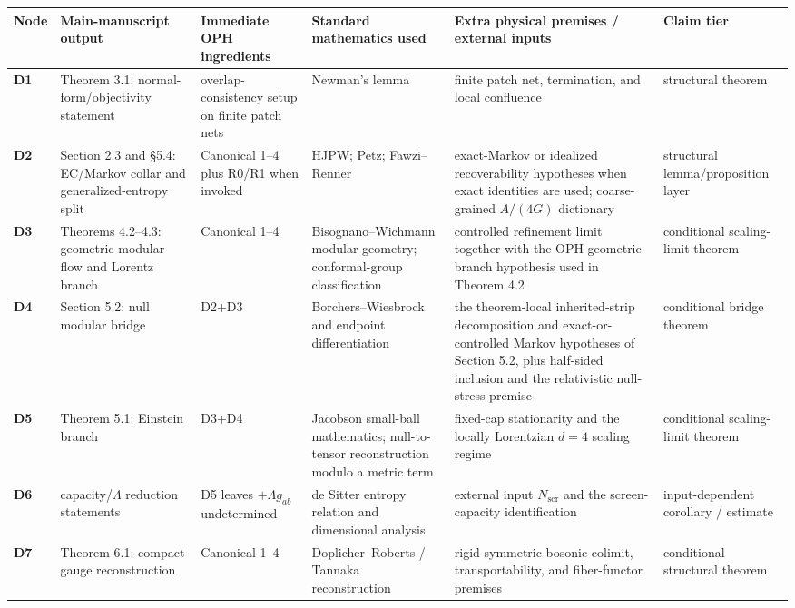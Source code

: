 \begingroup
\scriptsize
{\def\LTcaptype{none}
\setlength{\tabcolsep}{2pt}
\begin{longtable}[]{@{}>{\RaggedRight\arraybackslash}p{}>{\RaggedRight\arraybackslash}p{}>{\RaggedRight\arraybackslash}p{}>{\RaggedRight\arraybackslash}p{}>{\RaggedRight\arraybackslash}p{}>{\RaggedRight\arraybackslash}p{}@{}}
\toprule\noalign{}
Node & Main-manuscript output & Immediate OPH ingredients & Standard mathematics used & Extra physical premises / external inputs & Claim tier \\
\midrule\noalign{}
\endhead
\bottomrule\noalign{}
\endlastfoot
\textbf{D1} & Theorem 3.1: normal-form/objectivity statement & overlap-consistency setup on finite patch nets & Newman's lemma & finite patch net, termination, and local confluence & structural theorem \\
\textbf{D2} & Section 2.3 and \S5.4: EC/Markov collar and generalized-entropy split & Canonical 1--4 plus R0/R1 when invoked & HJPW; Petz; Fawzi--Renner & exact-Markov or idealized recoverability hypotheses when exact identities are used; coarse-grained \(A/(4G)\) dictionary & structural lemma/proposition layer \\
\textbf{D3} & Theorems 4.2--4.3: geometric modular flow and Lorentz branch & Canonical 1--4 & Bisognano--Wichmann modular geometry; conformal-group classification & controlled refinement limit together with the OPH geometric-branch hypothesis used in Theorem 4.2 & conditional scaling-limit theorem \\
\textbf{D4} & Section 5.2: null modular bridge & D2+D3 & Borchers--Wiesbrock and endpoint differentiation & the theorem-local inherited-strip decomposition and exact-or-controlled Markov hypotheses of Section 5.2, plus half-sided inclusion and the relativistic null-stress premise & conditional bridge theorem \\
\textbf{D5} & Theorem 5.1: Einstein branch & D3+D4 & Jacobson small-ball mathematics; null-to-tensor reconstruction modulo a metric term & fixed-cap stationarity and the locally Lorentzian \(d=4\) scaling regime & conditional scaling-limit theorem \\
\textbf{D6} & capacity/\(\Lambda\) reduction statements & D5 leaves \(+\Lambda g_{ab}\) undetermined & de Sitter entropy relation and dimensional analysis & external input \(N_{\mathrm{scr}}\) and the screen-capacity identification & input-dependent corollary / estimate \\
\textbf{D7} & Theorem 6.1: compact gauge reconstruction & Canonical 1--4 & Doplicher--Roberts / Tannaka reconstruction & rigid symmetric bosonic colimit, transportability, and fiber-functor premises & conditional structural theorem \\

\end{longtable}}
